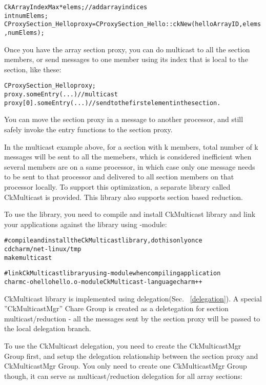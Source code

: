 \begin{alltt}
  CkArrayIndexMax *elems;    // add array indices
  int numElems;
  CProxySection_Hello proxy = CProxySection_Hello::ckNew(helloArrayID, elems, numElems);
\end{alltt}

Once you have the array section proxy, you can do multicast to all the 
section members, or send messages to one member using its index that
is local to the section, like these:

\begin{alltt}
  CProxySection_Hello proxy;
  proxy.someEntry(...)          // multicast
  proxy[0].someEntry(...)       // send to the first element in the section.
\end{alltt}

You can move the section proxy in a message to another processor, and still 
safely invoke the entry functions to the section proxy.

In the multicast example above, for a section with k members, total number 
of k messages will be sent to all the memebers, which is considered 
inefficient when several members are on a same processor, in which 
case only one message needs to be sent to that processor and delivered to
all section members on that processor locally. To support this optimization,
a separate library called CkMulticast is provided. This library also supports
section based reduction.

To use the library, you need to compile and install CkMulticast library and 
link your applications against the library using -module:

\begin{alltt}
  # compile and install the CkMulticast library, do this only once
  cd charm/net-linux/tmp
  make multicast

  # link CkMulticast library using -module when compiling application
  charmc  -o hello hello.o -module CkMulticast -language charm++ 
\end{alltt}

CkMulticast library is implemented using delegation(Sec. ~\ref{delegation}). 
A special ''CkMulticastMgr'' Chare Group is created as a 
deletegation for section multicast/reduction - all the messages sent
by the section proxy will be passed to the local delegation branch.

To use the CkMulticast delegation, you need to create the CkMulticastMgr Group 
first, and setup the delegation relationship between the section proxy and 
CkMulticastMgr Group. You only need to create one CkMulticastMgr Group though,
it can serve as multicast/reduction delegation for all array sections:


